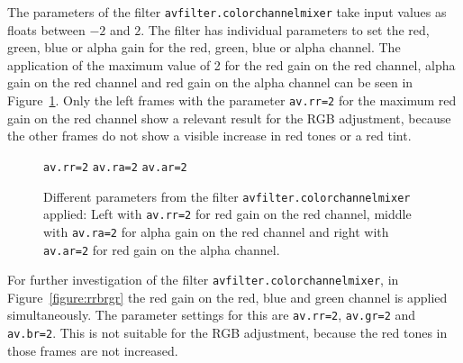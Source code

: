 \documentclass[../MasterThesis.tex]{subfiles}
\begin{document}
The parameters of the filter \texttt{avfilter.colorchannelmixer} take input values as floats between $-2$ and $2$. The filter has individual parameters to set the red, green, blue or alpha gain for the red, green, blue or alpha channel. The application of the maximum value of 2 for the red gain on the red channel, alpha gain on the red channel and red gain on the alpha channel can be seen in Figure~\ref{figure:rrraar}.
%
Only the left frames with the parameter \texttt{av.rr=2} for the maximum red gain on the red channel show a relevant result for the RGB adjustment, because the other frames do not show a visible increase in red tones or a red tint.

\begin{figure}[H]
	\begin{center}
		\small{
			\texttt{av.rr=2} \hspace*{0.22\textwidth} \texttt{av.ra=2} \hspace*{0.23\textwidth} \texttt{av.ar=2}}
		\caption[Different parameters from \texttt{avfilter.colorchannelmixer} applied.]{Different parameters from the filter \texttt{avfilter.colorchannelmixer} applied: Left with \texttt{av.rr=2} for red gain on the red channel, middle with \texttt{av.ra=2} for alpha gain on the red channel and right with \texttt{av.ar=2} for red gain on the alpha channel.}
		\label{figure:rrraar}
	\end{center}
\end{figure}


For further investigation of the filter \texttt{avfilter.colorchannelmixer}, in Figure~\ref{figure:rrbrgr} the red gain on the red, blue and green channel is applied simultaneously. The parameter settings for this are \texttt{av.rr=2}, \texttt{av.gr=2} and \texttt{av.br=2}. This is not suitable for the RGB adjustment, because the red tones in those frames are not increased.
\end{document}
